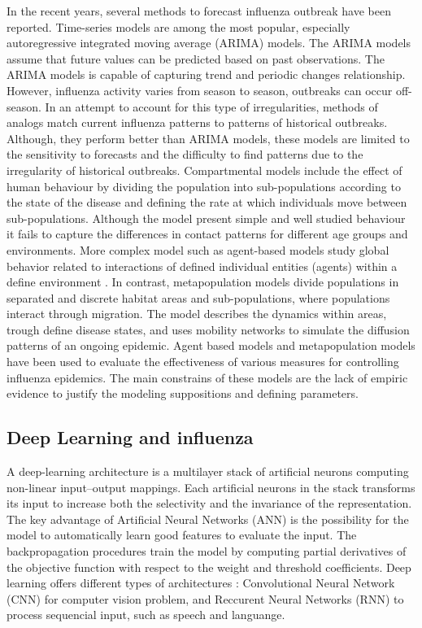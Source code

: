 \documentclass[12pt]{article}
\begin{document}
In the recent years, several  methods to forecast influenza outbreak have been reported\autocite{nsoesie2014}. Time-series models are among the most popular, especially  autoregressive integrated moving average (ARIMA) models. The ARIMA models assume that future values can be predicted based on past observations\autocite{quenel1998}. The ARIMA models is capable of capturing trend and periodic changes relationship. However, influenza activity varies from season to season, outbreaks can occur off-season. In an attempt to account for this type of irregularities, methods of analogs match current influenza patterns to patterns of historical outbreaks\autocite{viboud2003}. Although, they perform better than ARIMA models, these models are limited to the sensitivity to forecasts and the difficulty to find patterns due to the irregularity of historical outbreaks. Compartmental models include the effect of human behaviour by dividing the population into sub-populations according to the state of the disease and defining the rate at which individuals move between sub-populations. Although the model present simple and well studied behaviour it fails to capture the differences in contact patterns for different age groups and environments\autocite{degli2008}. More complex model such as agent-based models study global behavior related to interactions of defined individual entities (agents) within a define environment \autocite{carrasco2013}. In contrast, metapopulation models divide populations in separated and discrete habitat areas and sub-populations, where populations interact through migration. The model describes the dynamics within areas, trough define disease states, and uses mobility networks to simulate the diffusion patterns of an ongoing epidemic. Agent based models and metapopulation models have been used to evaluate the effectiveness of various measures for controlling influenza epidemics. The main constrains of these models are the lack of empiric evidence to justify the modeling suppositions and defining parameters\autocite{nsoesie2014}.


\subsection{Deep Learning and influenza}
A deep-learning architecture is a multilayer stack of artificial neurons computing non-linear input–output mappings. Each artificial neurons in the stack transforms its input to increase both the selectivity and the invariance of the representation\autocite{leCun2015}. The key advantage of Artificial Neural Networks (ANN) is the possibility for the model to automatically learn good features to evaluate the input. The backpropagation procedures train the model by computing partial derivatives of the objective function with respect to the weight and threshold coefficients. Deep learning offers different types of architectures : Convolutional Neural Network (CNN) for computer vision problem, and Reccurent Neural Networks (RNN) to process sequencial input, such as speech and languange\autocite{leCun2015, Miotto2017}. 
 
\end{document}
